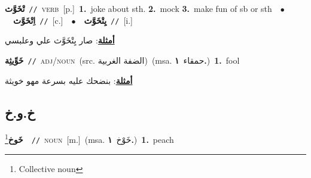 \documentclass[10pt,a4paper,twoside]{article} %
\begin{document}
\begin{multicols}{2}
{\setlength\topsep{0pt}\textbf{\foreignlanguage{arabic}{تْخَوَّث}}\ {\color{gray}\texttt{//}\color{black}}\ \textsc{verb}\ [p.]\ \textbf{1.}~joke about sth.  \textbf{2.}~mock  \textbf{3.}~make fun of sb or sth\ \ $\bullet$\ \ \setlength\topsep{0pt}\textbf{\foreignlanguage{arabic}{اِتْخَوَّث}}\ {\color{gray}\texttt{//}\color{black}}\ [c.]\ \ $\bullet$\ \ \setlength\topsep{0pt}\textbf{\foreignlanguage{arabic}{يِتْخَوَّث}}\ {\color{gray}\texttt{//}\color{black}}\ [i.]\  \begin{flushright}\color{gray}\foreignlanguage{arabic}{\textbf{\underline{\foreignlanguage{arabic}{أمثلة}}}: صار يِتْخَوَّث علي وعلبسي}\end{flushright}\color{black}} \vspace{2mm}

{\setlength\topsep{0pt}\textbf{\foreignlanguage{arabic}{خَوِّيثِة}}\ {\color{gray}\texttt{//}\color{black}}\ \textsc{adj/noun}\ (src. \color{gray}\foreignlanguage{arabic}{الضفة الغربية}\color{black})\ \color{gray}(msa. \foreignlanguage{arabic}{حمقاء}~\foreignlanguage{arabic}{\textbf{١.}})\color{black}\ \textbf{1.}~fool\  \begin{flushright}\color{gray}\foreignlanguage{arabic}{\textbf{\underline{\foreignlanguage{arabic}{أمثلة}}}: بنضحك عليه بسرعة مهو خويثة}\end{flushright}\color{black}} \vspace{2mm}

\vspace{-3mm}
\subsection*{\color{blue}\foreignlanguage{arabic}{خ.و.خ}\color{blue}{}} 

{\setlength\topsep{0pt}\textbf{\foreignlanguage{arabic}{خَوخ}}\footnote{Collective noun}\ \ {\color{gray}\texttt{//}\color{black}}\ \textsc{noun}\ [m.]\ \color{gray}(msa. \foreignlanguage{arabic}{خَوْخ}~\foreignlanguage{arabic}{\textbf{١.}})\color{black}\ \textbf{1.}~peach\ } \vspace{2mm}


\end{multicols}
\end{document}
